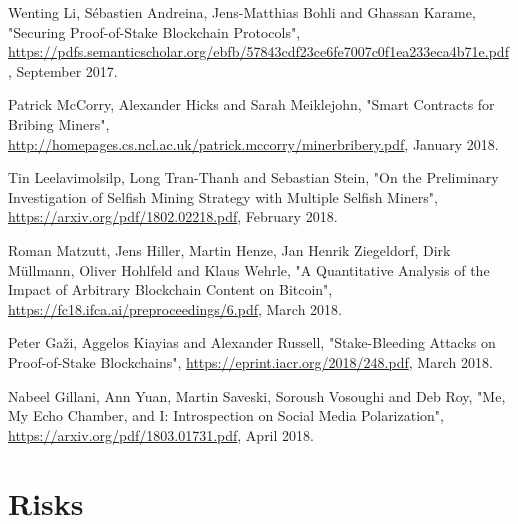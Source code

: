 \documentclass[12pt,a4paper]{article}
\begin{document}
\begin{thebibliography}{9}
Wenting Li, Sébastien Andreina, Jens-Matthias Bohli and Ghassan Karame,
"Securing Proof-of-Stake Blockchain Protocols",
\url{https://pdfs.semanticscholar.org/ebfb/57843cdf23ce6fe7007c0f1ea233eca4b71e.pdf},
September 2017.

Patrick McCorry, Alexander Hicks and Sarah Meiklejohn,
"Smart Contracts for Bribing Miners",
\url{http://homepages.cs.ncl.ac.uk/patrick.mccorry/minerbribery.pdf},
January 2018.

Tin Leelavimolsilp, Long Tran-Thanh and Sebastian Stein,
"On the Preliminary Investigation of Selfish Mining Strategy with Multiple Selfish Miners",
\url{https://arxiv.org/pdf/1802.02218.pdf},
February 2018.

Roman Matzutt, Jens Hiller, Martin Henze, Jan Henrik Ziegeldorf, Dirk Müllmann, Oliver Hohlfeld and Klaus Wehrle,
"A Quantitative Analysis of the Impact of Arbitrary Blockchain Content on Bitcoin",
\url{https://fc18.ifca.ai/preproceedings/6.pdf},
March 2018.

Peter Gaži, Aggelos Kiayias and Alexander Russell,
"Stake-Bleeding Attacks on Proof-of-Stake Blockchains",
\url{https://eprint.iacr.org/2018/248.pdf},
March 2018.

Nabeel Gillani, Ann Yuan, Martin Saveski, Soroush Vosoughi and Deb Roy,
"Me, My Echo Chamber, and I: Introspection on Social Media Polarization",
\url{https://arxiv.org/pdf/1803.01731.pdf},
April 2018.

\end{thebibliography}

\newpage
\printglossary[type=\acronymtype]

\newpage
\printglossary

\newpage
\appendix

\section{Risks}
\end{document}
